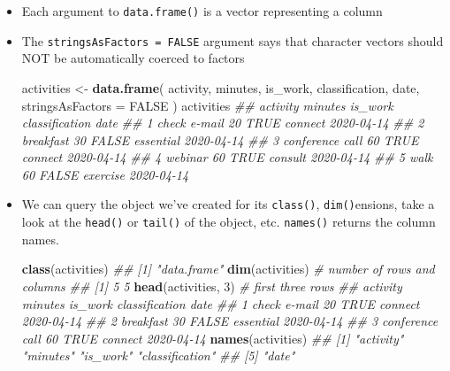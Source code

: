 \documentclass[
]{book}
\newenvironment{Shaded}{\begin{snugshade}}{\end{snugshade}}
\newcommand{\CommentTok}[1]{\textcolor[rgb]{0.56,0.35,0.01}{\textit{#1}}}
\newcommand{\DataTypeTok}[1]{\textcolor[rgb]{0.13,0.29,0.53}{#1}}
\newcommand{\DecValTok}[1]{\textcolor[rgb]{0.00,0.00,0.81}{#1}}
\newcommand{\KeywordTok}[1]{\textcolor[rgb]{0.13,0.29,0.53}{\textbf{#1}}}
\newcommand{\NormalTok}[1]{#1}
\newcommand{\OtherTok}[1]{\textcolor[rgb]{0.56,0.35,0.01}{#1}}
\newcommand{\StringTok}[1]{\textcolor[rgb]{0.31,0.60,0.02}{#1}}
\begin{document}
\begin{itemize}
\item
  Each argument to \texttt{data.frame()} is a vector representing a column
\item
  The \texttt{stringsAsFactors\ =\ FALSE} argument says that character vectors should NOT be automatically coerced to factors

\begin{Shaded}
\begin{Highlighting}[]
\NormalTok{activities <-}\StringTok{ }\KeywordTok{data.frame}\NormalTok{(}
\NormalTok{    activity, minutes, is_work, classification, date,}
    \DataTypeTok{stringsAsFactors =} \OtherTok{FALSE}
\NormalTok{)}
\NormalTok{activities}
\CommentTok{##          activity minutes is_work classification       date}
\CommentTok{## 1    check e-mail      20    TRUE        connect 2020-04-14}
\CommentTok{## 2       breakfast      30   FALSE      essential 2020-04-14}
\CommentTok{## 3 conference call      60    TRUE        connect 2020-04-14}
\CommentTok{## 4         webinar      60    TRUE        consult 2020-04-14}
\CommentTok{## 5            walk      60   FALSE       exercise 2020-04-14}
\end{Highlighting}
\end{Shaded}
\item
  We can query the object we've created for its \texttt{class()}, \texttt{dim()}ensions, take a look at the \texttt{head()} or \texttt{tail()} of the object, etc. \texttt{names()} returns the column names.

\begin{Shaded}
\begin{Highlighting}[]
\KeywordTok{class}\NormalTok{(activities)}
\CommentTok{## [1] "data.frame"}
\KeywordTok{dim}\NormalTok{(activities)     }\CommentTok{# number of rows and columns}
\CommentTok{## [1] 5 5}
\KeywordTok{head}\NormalTok{(activities, }\DecValTok{3}\NormalTok{) }\CommentTok{# first three rows}
\CommentTok{##          activity minutes is_work classification       date}
\CommentTok{## 1    check e-mail      20    TRUE        connect 2020-04-14}
\CommentTok{## 2       breakfast      30   FALSE      essential 2020-04-14}
\CommentTok{## 3 conference call      60    TRUE        connect 2020-04-14}
\KeywordTok{names}\NormalTok{(activities)}
\CommentTok{## [1] "activity"       "minutes"        "is_work"        "classification"}
\CommentTok{## [5] "date"}
\end{Highlighting}
\end{Shaded}
\end{itemize}
\end{document}
